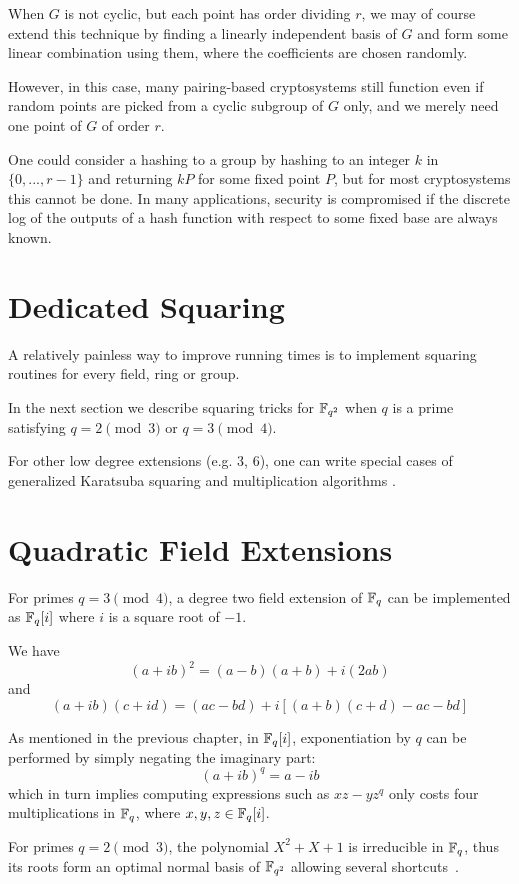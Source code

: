 When $G$ is not cyclic, but each point has order dividing $r$,
we may of course extend this technique by finding a linearly independent
basis of $G$ and form some linear combination using them,
where the coefficients are chosen randomly.

However, in this case,
many pairing-based cryptosystems still function even if random
points are picked from a cyclic subgroup of $G$ only, and we merely need
one point of $G$ of order $r$.

One could consider a hashing to a group by
hashing to an integer $k$ in $\{0,...,r-1\}$ and returning $kP$
for some fixed point $P$, but for most cryptosystems this cannot be done.
In many applications, security is compromised if the discrete log of
the outputs of a hash function with respect to some fixed base are always
known.

\section{Dedicated Squaring}

A relatively painless way to improve running times
is to implement squaring routines for every field, ring or group.

In the next section we describe squaring tricks
for $\mathbb{F}_{q^2}$ when $q$ is a prime satisfying $q = 2 \pmod 3$
or $q = 3 \pmod 4$.

For other low degree extensions (e.g. 3, 6),
one can write special cases of generalized Karatsuba squaring and
multiplication algorithms \cite{wpkaratsuba}.

\section{\label{sec:quadext}Quadratic Field Extensions}

For primes $q=3\pmod 4$, a degree two field extension of $\mathbb{F}_q$
can be implemented as $\mathbb{F}_q[i]$ where $i$ is a square root of $-1$.

We have
\[ (a + i b)^2 = (a - b)(a + b) + i (2 a b) \]
and
\[ (a + i b)(c + i d) = (ac - bd) + i[(a + b)(c + d) - ac - bd] \]

As mentioned in the previous chapter, in $\mathbb{F}_q[i]$,
exponentiation by $q$ can be performed by simply negating the imaginary part:
\[ (a+ib)^q = a - ib \]
which in turn implies computing expressions such as $x z - y z^q$ only
costs four multiplications in $\mathbb{F}_q$, where $x,y,z \in \mathbb{F}_q[i]$.

For primes $q=2\pmod 3$,
the polynomial $X^2 + X + 1$ is irreducible in $\mathbb{F}_q$, thus its roots
form an optimal normal basis of $\mathbb{F}_{q^2}$
allowing several shortcuts~\cite{xtr}.

